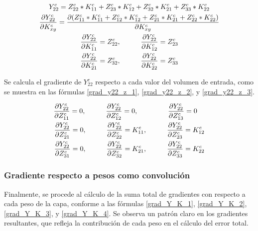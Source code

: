 \begin{gather}
	Y^c_{22} = Z^c_{22} * K^c_{11} + Z^c_{23} * K^c_{12} + Z^c_{32} * K^c_{21} + Z^c_{33} * K^c_{22} \\
	\frac{\partial Y^c_{22}}{\partial K^c_{xy}} = \frac{\partial (Z^c_{11} * K^c_{11} + Z^c_{12} * K^c_{12} + Z^c_{21} * K^c_{21} + Z^c_{22} * K^c_{22})}{\partial K^c_{xy}} \\
	\frac{\partial Y^c_{22}}{\partial K^c_{11}} = Z^c_{22}, \hspace{10mm} \frac{\partial Y^c_{22}}{\partial K^c_{12}} = Z^c_{23} \label{grad_y22_k_1} \\
	\frac{\partial Y^c_{22}}{\partial K^c_{21}} = Z^c_{32}, \hspace{10mm} \frac{\partial Y^c_{22}}{\partial K^c_{22}} = Z^c_{33} \label{grad_y22_k_2}
\end{gather}

Se calcula el gradiente de $Y^c_{22}$ respecto a cada valor del volumen de entrada, como se muestra en las fórmulas \ref{grad_y22_z_1}, \ref{grad_y22_z_2}, y \ref{grad_y22_z_3}.

\begin{gather}
	\frac{\partial Y^c_{22}}{\partial Z^c_{11}} = 0, \hspace{10mm} \frac{\partial Y^c_{22}}{\partial Z^c_{12}} = 0, \hspace{15mm} \frac{\partial Y^c_{22}}{\partial Z^c_{13}} = 0 \hspace{4mm} \label{grad_y22_z_1} \\
	\frac{\partial Y^c_{22}}{\partial Z^c_{21}} = 0, \hspace{10mm} \frac{\partial Y^c_{22}}{\partial Z^c_{22}} = K^c_{11}, \hspace{10mm} \frac{\partial Y^c_{22}}{\partial Z^c_{23}} = K^c_{12} \label{grad_y22_z_2} \\
	\frac{\partial Y^c_{22}}{\partial Z^c_{31}} = 0, \hspace{10mm} \frac{\partial Y^c_{22}}{\partial Z^c_{32}} = K^c_{21}, \hspace{10mm} \frac{\partial Y^c_{22}}{\partial Z^c_{33}} = K^c_{22} \label{grad_y22_z_3}
\end{gather}

\subsubsection{Gradiente respecto a pesos como convolución}

Finalmente, se procede al cálculo de la suma total de gradientes con respecto a cada peso de la capa, conforme a las fórmulas \ref{grad_Y_K_1}, \ref{grad_Y_K_2}, \ref{grad_Y_K_3}, y \ref{grad_Y_K_4}. Se observa un patrón claro en los gradientes resultantes, que refleja la contribución de cada peso en el cálculo del error total.

